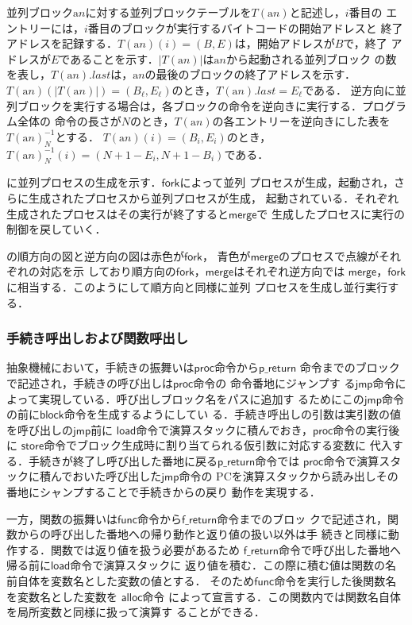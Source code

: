 \documentclass[submit,PRO]{ipsj}
\newcommand{\bcode}[1]{$\mathsf{#1}$}
\newcommand{\alabel}[1]{\mathrm{a}#1}
\begin{document}
並列ブロック$\alabel{n}$に対する並列ブロックテーブルを$T(\alabel{n})$と記述し，$i$番目の
エントリーには，$i$番目のブロックが実行するバイトコードの開始アドレスと
終了アドレスを記録する．$T(\alabel{n})(i)=(B,E)$は，開始アドレスが$B$で，終了
アドレスが$E$であることを示す．$|T(\alabel{n})|$は$\alabel{n}$から起動される並列ブロック
の数を表し，$T(\alabel{n}).last$は，$\alabel{n}$の最後のブロックの終了アドレスを示す．
$T(\alabel{n})(|T(\alabel{n})|)=(B_\ell,E_\ell)$のとき，$T(\alabel{n}).last=E_\ell$である．
逆方向に並列ブロックを実行する場合は，各ブロックの命令を逆向きに実行する．プログラム全体の
命令の長さが$N$のとき，$T(\alabel{n})$の各エントリーを逆向きにした表を$T(\alabel{n})^{-1}_N$とする．
$T(\alabel{n})(i)=(B_i,E_i)$のとき，$T(\alabel{n})^{-1}_N(i)=(N+1-E_i,N+1-B_i)$である．

に並列プロセスの生成を示す．\bcode{fork}によって並列
プロセスが生成，起動され，さらに生成されたプロセスから並列プロセスが生成，
起動されている．それぞれ生成されたプロセスはその実行が終了すると\bcode{merge}で
生成したプロセスに実行の制御を戻していく．

の順方向の図と逆方向の図は赤色が\bcode{fork}，
青色が\bcode{merge}のプロセスで点線がそれぞれの対応を示
しており順方向の\bcode{fork}，\bcode{merge}はそれぞれ逆方向では
\bcode{merge}，\bcode{fork}に相当する．このようにして順方向と同様に並列
プロセスを生成し並行実行する．

\subsubsection{手続き呼出しおよび関数呼出し}

抽象機械において，手続きの振舞いは\bcode{proc}命令から\bcode{p\_return}
命令までのブロックで記述され，手続きの呼び出しは\bcode{proc}命令の
命令番地にジャンプす
る\bcode{jmp}命令によって実現している．呼び出しブロック名をパスに追加す
るためにこの\bcode{jmp}命令の前に\bcode{block}命令を生成するようにしてい
る．手続き呼出しの引数は実引数の値を呼び出しの\bcode{jmp}前に
\bcode{load}命令で演算スタックに積んでおき，\bcode{proc}命令の実行後に
\bcode{store}命令でブロック生成時に割り当てられる仮引数に対応する変数に
代入する．手続きが終了し呼び出した番地に戻る\bcode{p\_return}命令では
\bcode{proc}命令で演算スタックに積んでおいた呼び出した\bcode{jmp}命令の
PCを演算スタックから読み出しその番地にシャンプすることで手続きからの戻り
動作を実現する．

一方，関数の振舞いは\bcode{func}命令から\bcode{f\_return}命令までのブロッ
クで記述され，関数からの呼び出した番地への帰り動作と返り値の扱い以外は手
続きと同様に動作する．関数では返り値を扱う必要があるため
\bcode{f\_return}命令で呼び出した番地へ帰る前に\bcode{load}命令で演算スタックに
返り値を積む．この際に積む値は関数の名前自体を変数名とした変数の値とする．
そのため\bcode{func}命令を実行した後関数名を変数名とした変数を
\bcode{alloc}命令
によって宣言する．この関数内では関数名自体を局所変数と同様に扱って演算す
ることができる．
\end{document}
